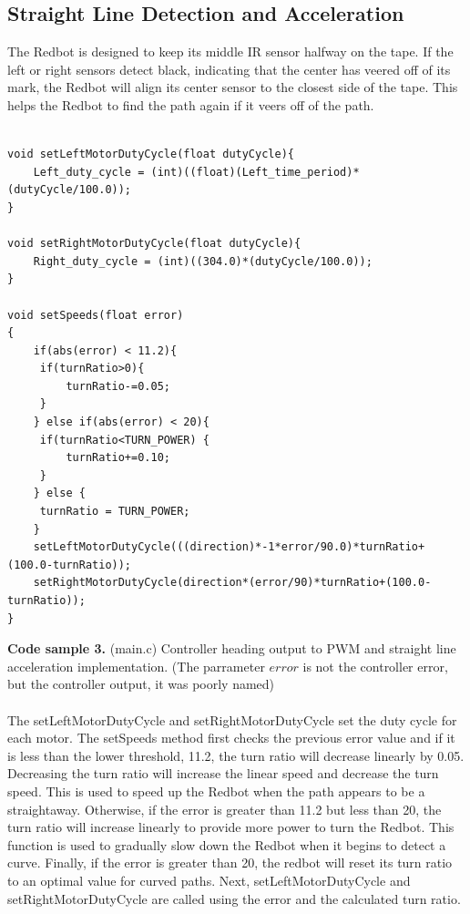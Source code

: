 \documentclass{article}
\begin{document}
\subsection{Straight Line Detection and Acceleration}
The Redbot is designed to keep its middle IR sensor halfway on the tape.  If the left or right sensors detect black, indicating that the center has veered off of its mark, the Redbot will align its center sensor to the closest side of the tape.  This helps the Redbot to find the path again if it veers off of the path.
\\\\
\begin{lstlisting}
void setLeftMotorDutyCycle(float dutyCycle){
    Left_duty_cycle = (int)((float)(Left_time_period)*(dutyCycle/100.0));
}

void setRightMotorDutyCycle(float dutyCycle){
    Right_duty_cycle = (int)((304.0)*(dutyCycle/100.0));
}

void setSpeeds(float error)
{
    if(abs(error) < 11.2){
   	 if(turnRatio>0){
   		 turnRatio-=0.05;
   	 }
    } else if(abs(error) < 20){
   	 if(turnRatio<TURN_POWER) {
   		 turnRatio+=0.10;
   	 }
    } else {
   	 turnRatio = TURN_POWER;
    }
    setLeftMotorDutyCycle(((direction)*-1*error/90.0)*turnRatio+(100.0-turnRatio));
    setRightMotorDutyCycle(direction*(error/90)*turnRatio+(100.0-turnRatio));
}
\end{lstlisting}
\textbf{Code sample 3.} (main.c) Controller heading output to PWM and straight line acceleration implementation. (The parrameter $error$ is not the controller error, but the controller output, it was poorly named)
\\\\
The setLeftMotorDutyCycle and setRightMotorDutyCycle set the duty cycle for each motor.  The setSpeeds method first checks the previous error value and if it is less than the lower threshold, 11.2, the turn ratio will decrease linearly by 0.05.  Decreasing the turn ratio will increase the linear speed and decrease the turn speed.  This is used to speed up the Redbot when the path appears to be a straightaway.  Otherwise, if the error is greater than 11.2 but less than 20, the turn ratio will increase linearly to provide more power to turn the Redbot.  This function is used to gradually slow down the Redbot when it begins to detect a curve.  Finally, if the error is greater than 20, the redbot will reset its turn ratio to an optimal value for curved paths.  Next, setLeftMotorDutyCycle and setRightMotorDutyCycle are called using the error and the calculated turn ratio.
\end{document}
